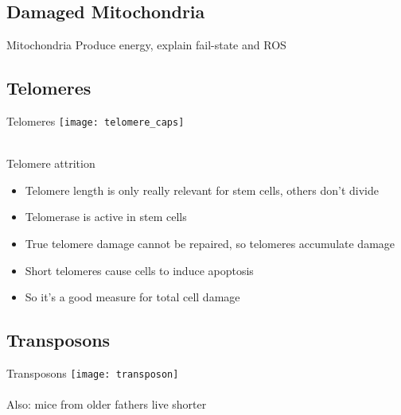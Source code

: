 \subsection{Damaged Mitochondria}
\begin{frame}[c]{Mitochondria}
    Produce energy, explain fail-state and ROS
\end{frame}

\subsection{Telomeres}
\begin{frame}[c]{Telomeres}
    \texttt{[image: telomere\_caps]} \\
    \cite{schmutz2016shelterin} \\
\end{frame}

\begin{frame}[c]{Telomere attrition}
    \large
    \begin{itemize}[<+(1)->]
        \item Telomere length is only really relevant for stem cells, others don't divide
        \item Telomerase is active in stem cells
        \item True telomere damage cannot be repaired, so telomeres accumulate damage \cite{NintilTh68:online}
        \item Short telomeres cause cells to induce apoptosis
        \item So it's a good measure for total cell damage \cite{victorelli2017telomeres} 
    \end{itemize}
\end{frame}

\subsection{Transposons}
\begin{frame}[c]{Transposons}
    \texttt{[image: transposon]} \\
    \cite{walter2015transposon} \\
    Also: mice from older fathers live shorter \cite{xie2018epigenetic}
\end{frame}

